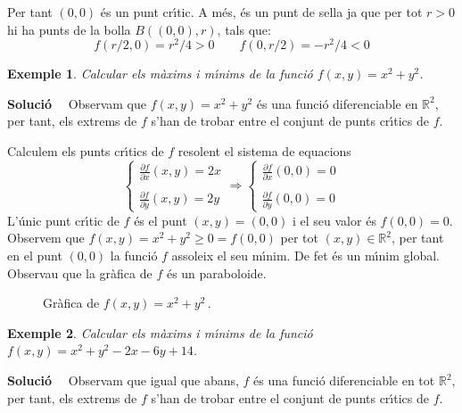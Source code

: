 \documentclass[12pt]{article}
\newcommand{\solucio}{\textbf{Soluci{\'o}}\ \ }
\newtheorem{exemple}{Exemple}[subsection]
\newcommand{\R}{\mathbb{R}}
\begin{document}
Per tant $(0,0) $ {\'e}s un punt cr{\'\i}tic. A m{\'e}s, {\'e}s un punt de sella ja que per tot $r>0$ hi ha punts de la bolla $B((0,0),r)$, tals que:
$$
f(r/2,0)=r^2/4>0\qquad f(0,r/2)=-r^2/4<0
$$


\vspace{0.4cm}
\begin{exemple}
Calcular els m{\`a}xims i m{\'\i}nims de la funci{\'o} $ f (x, y) = x ^ 2 +y ^ 2 $.
\end{exemple}

\solucio
Observam que $ f (x, y) = x ^ 2 +y ^ 2 $ {\'e}s una funci{\'o} diferenciable en
$ \R ^ 2 $, per tant, els extrems de $ f $ s'han de trobar entre
el conjunt de punts cr{\'\i}tics de $ f $.

Calculem els punts cr{\'\i}tics de $ f $ resolent el sistema de
equacions
\[
\begin{cases}
\displaystyle\frac{\partial f}{\partial x}(x,y) = 2x \\
\\
\displaystyle \frac{\partial f}{\partial y}(x,y) = 2y
\end{cases} \Longrightarrow \begin{cases}
\displaystyle\frac{\partial f}{\partial x}(0,0) = 0 \\
\\
\displaystyle \frac{\partial f}{\partial y}(0,0) = 0
\end{cases}
\]
L'{\'u}nic punt cr{\'\i}tic de $ f $ {\'e}s el punt $ (x, y) = (0,0) $ i el seu valor
{\'e}s $ f (0,0) = 0 $. Observem que $ f (x, y) = x ^ 2+y ^ 2 \geq 0 = f (0,0) $ per
tot $ (x, y) \in \R ^ 2 $, per tant en el punt $ (0,0) $ la funci{\'o} $ f $
assoleix el seu m{\'\i}nim. De fet {\'e}s un m{\'\i}nim global. Observau que la
gr{\`a}fica de $ f $ {\'e}s un paraboloide.
\begin{figure} [h!]
\begin{center}
\end{center}\caption{Gr{\`a}fica de $f(x,y)=x^2+y^2\,.$}
\end{figure}



\vspace{0.4cm}
\begin{exemple}
Calcular els m{\`a}xims i m{\'\i}nims de la funci{\'o}
$ f (x, y) = x ^ 2 +y ^2-2x-6y + 14$.
\end{exemple}

\solucio
Observam que igual que abans, $ f $ {\'e}s una funci{\'o} diferenciable
en tot $ \R ^ 2 $, per tant, els extrems de $ f $ s'han de
trobar entre el conjunt de punts cr{\'\i}tics de $ f $.
\end{document}
